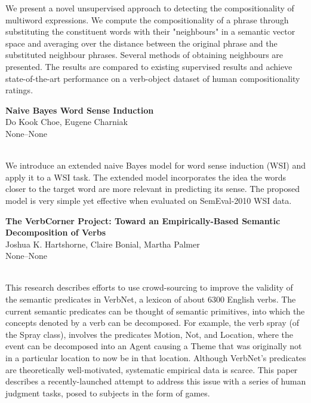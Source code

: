 \documentclass[twoside,makeidx]{book}
\renewcommand{\normalsize}{\fontsize{8}{9}\selectfont}
\renewcommand{\small}{\fontsize{7}{8}\selectfont}
\begin{document}
\nopagebreak%
\noindent%
{\small We present a novel unsupervised approach to detecting the compositionality of multiword expressions. We compute the compositionality of a phrase through substituting the constituent words with their "neighbours" in a semantic vector space and averaging over the distance between the original phrase and the substituted neighbour phrases. Several methods of obtaining neighbours are presented. The results are compared to existing supervised results and achieve state-of-the-art performance on a verb-object dataset of human compositionality ratings.}
\par\vspace{2em}\noindent%
\begin{minipage}{\linewidth}%
\begin{center}
\textbf{\normalsize Naive Bayes Word Sense Induction}\\
\normalsize  Do Kook Choe,  Eugene Charniak\\
{\small None--None}\\
\end{center}
\end{minipage}\\[0.5em]
\nopagebreak%
\noindent%
{\small We introduce an extended naive Bayes model for word sense induction (WSI) and apply it to a WSI task. The extended model incorporates the idea the words closer to the target word are more relevant in predicting its sense. The proposed model is very simple yet effective when evaluated on SemEval-2010 WSI data.}
\par\vspace{2em}\noindent%
\begin{minipage}{\linewidth}%
\begin{center}
\textbf{\normalsize The VerbCorner Project: Toward an Empirically-Based Semantic Decomposition of Verbs}\\
\normalsize  Joshua K. Hartshorne,  Claire Bonial,  Martha Palmer\\
{\small None--None}\\
\end{center}
\end{minipage}\\[0.5em]
\nopagebreak%
\noindent%
{\small This research describes efforts to use crowd-sourcing to improve the validity of the semantic predicates in VerbNet, a lexicon of about 6300 English verbs. The current semantic predicates can be thought of semantic primitives, into which the concepts denoted by a verb can be decomposed.  For example, the verb spray (of the Spray class), involves the predicates Motion, Not, and Location, where the event can be decomposed into an Agent causing a Theme that was originally not in a particular location to now be in that location.  Although VerbNet's predicates are theoretically well-motivated, systematic empirical data is scarce.  This paper describes a recently-launched attempt to address this issue with a series of human judgment tasks, posed to subjects in the form of games.}
\end{document}
